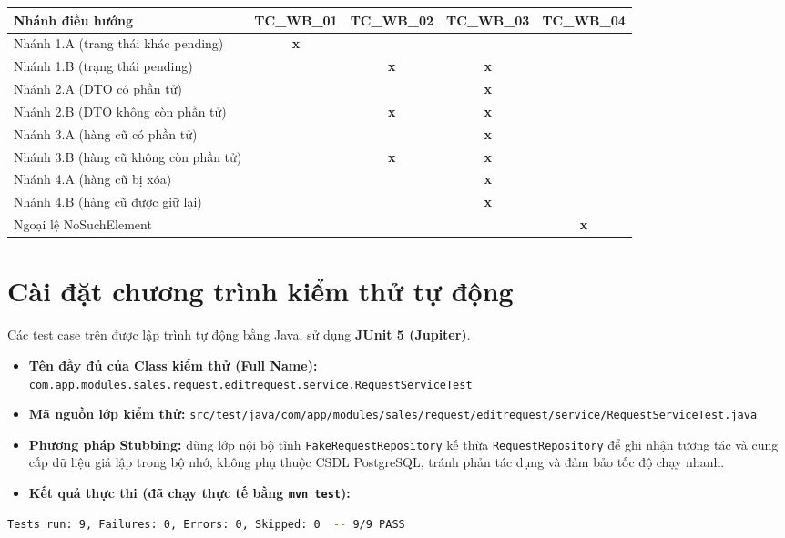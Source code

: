 \documentclass[12pt,a4paper]{article}
\begin{document}
\begin{table}[H]
\centering
\footnotesize
\begin{tabularx}{\textwidth}{|Y|c|c|c|c|}
\hline
{}
\textbf{Nhánh điều hướng} & \textbf{TC\_WB\_01} & \textbf{TC\_WB\_02} & \textbf{TC\_WB\_03} & \textbf{TC\_WB\_04}\\ \hline
Nhánh 1.A (trạng thái khác pending) & \textbf{x} & & & \\ \hline
Nhánh 1.B (trạng thái pending) & & \textbf{x} & \textbf{x} & \\ \hline
Nhánh 2.A (DTO có phần tử) & & & \textbf{x} & \\ \hline
Nhánh 2.B (DTO không còn phần tử) & & \textbf{x} & \textbf{x} & \\ \hline
Nhánh 3.A (hàng cũ có phần tử) & & & \textbf{x} & \\ \hline
Nhánh 3.B (hàng cũ không còn phần tử) & & \textbf{x} & \textbf{x} & \\ \hline
Nhánh 4.A (hàng cũ bị xóa) & & & \textbf{x} & \\ \hline
Nhánh 4.B (hàng cũ được giữ lại) & & & \textbf{x} & \\ \hline
Ngoại lệ NoSuchElement & & & & \textbf{x}\\ \hline
\end{tabularx}
\end{table}

\section{Cài đặt chương trình kiểm thử tự động}

Các test case trên được lập trình tự động bằng Java, sử dụng \textbf{JUnit 5 (Jupiter)}.
\begin{itemize}[leftmargin=*]
  \item \textbf{Tên đầy đủ của Class kiểm thử (Full Name):}\\ \texttt{com.app.modules.sales.request.editrequest.service.RequestServiceTest}
  \item \textbf{Mã nguồn lớp kiểm thử:} \texttt{src/test/java/com/app/modules/sales/request/editrequest/service/RequestServiceTest.java}
  \item \textbf{Phương pháp Stubbing:} dùng lớp nội bộ tĩnh \texttt{FakeRequestRepository} kế thừa \texttt{RequestRepository} để ghi nhận tương tác và cung cấp dữ liệu giả lập trong bộ nhớ, không phụ thuộc CSDL PostgreSQL, tránh phản tác dụng và đảm bảo tốc độ chạy nhanh.
  \item \textbf{Kết quả thực thi (đã chạy thực tế bằng \texttt{mvn test}):}
\end{itemize}
\begin{lstlisting}[language=bash, numbers=none]
Tests run: 9, Failures: 0, Errors: 0, Skipped: 0  -- 9/9 PASS
\end{lstlisting}
\end{document}
